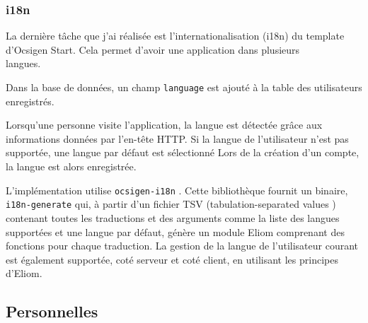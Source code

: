 %
%

\subsubsection*{i18n}

La dernière tâche que j'ai réalisée est l'internationalisation (i18n) du template
d'Ocsigen Start. Cela permet d'avoir une application dans
plusieurs \\ langues.

Dans la base de données, un champ \verb|language| est ajouté à la table des
utilisateurs enregistrés.

Lorsqu'une personne visite l'application, la langue est détectée grâce aux
informations données par l'en-tête HTTP. Si la langue de l'utilisateur n'est pas
supportée, une langue par défaut est sélectionné Lors de la création d'un compte, la
langue est alors enregistrée.

L'implémentation utilise \verb|ocsigen-i18n| \cite{ocsigen-i18n}. Cette
bibliothèque fournit un binaire, \verb|i18n-generate| qui, à partir d'un fichier
TSV (\og tabulation-separated values \fg) contenant toutes les traductions et
des arguments comme la liste des langues supportées et une langue par défaut,
génère un module Eliom comprenant des fonctions pour chaque traduction. La
gestion de la langue de l'utilisateur courant est également supportée, coté
serveur et coté client, en utilisant les principes d'Eliom.


\subsection{Personnelles}

